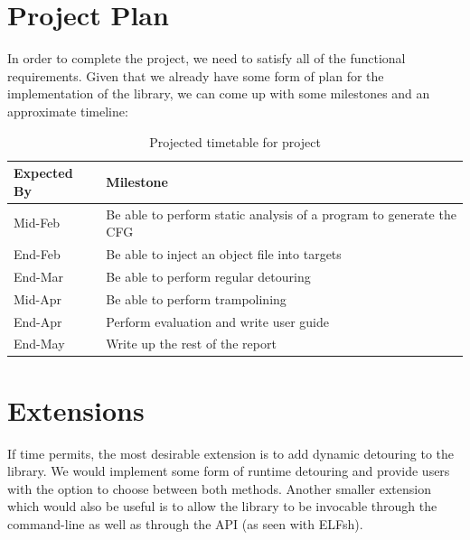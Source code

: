 \chapter{Project Plan}

In order to complete the project, we need to satisfy all of the functional requirements. Given that we already have some form of plan for the implementation of the library, we can come up with some milestones and an approximate timeline:

\begin{table}[H]
 \caption{Projected timetable for project}
 \begin{tabular}{l p{12cm} }
 \hline
 Expected By & Milestone \\
 \hline
 Mid-Feb & Be able to perform static analysis of a program to generate the CFG \\
 End-Feb & Be able to inject an object file into targets \\
 End-Mar & Be able to perform regular detouring \\
 Mid-Apr & Be able to perform trampolining \\
 End-Apr & Perform evaluation and write user guide\\
 End-May & Write up the rest of the report \\
 \hline
 \end{tabular}
\end{table}

\chapter{Extensions}

If time permits, the most desirable extension is to add dynamic detouring to the library. We would implement some form of runtime detouring and provide users with the option to choose between both methods. Another smaller extension which would also be useful is to allow the library to be invocable through the command-line as well as through the API (as seen with ELFsh).